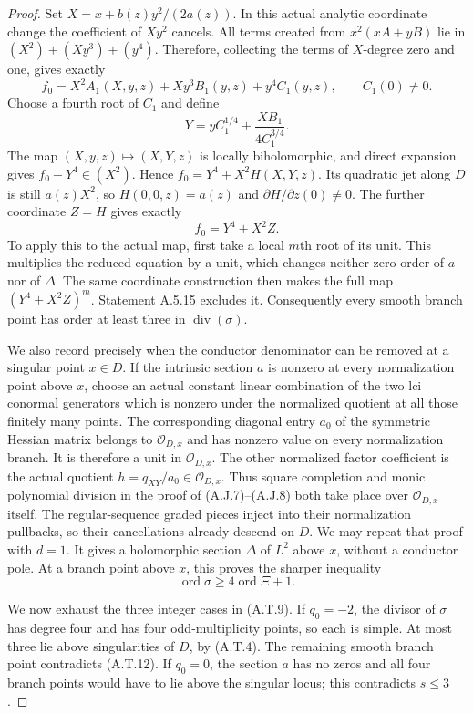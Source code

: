 \begin{proof}
Set $X=x+b(z)y^2/(2a(z))$. In this actual analytic
coordinate change the coefficient of $Xy^2$ cancels.
All terms created from $x^2(xA+yB)$ lie in
$(X^2)+(Xy^3)+(y^4)$. Therefore, collecting the
terms of $X$-degree zero and one, gives exactly
\[
 f_0=X^2A_1(X,y,z)+Xy^3B_1(y,z)+y^4C_1(y,z),
 \qquad C_1(0)\ne0.
\]
Choose a fourth root of $C_1$ and define
\[
 Y=yC_1^{1/4}+
                  \frac{XB_1}{4C_1^{3/4}}.
                                                        \tag{A.T.11}
\]
The map $(X,y,z)\mapsto(X,Y,z)$ is locally
biholomorphic, and direct expansion gives
$f_0-Y^4\in(X^2)$. Hence $f_0=Y^4+X^2H(X,Y,z)$.
Its quadratic jet along $D$ is still $a(z)X^2$,
so $H(0,0,z)=a(z)$ and $\partial H/\partial z(0)\ne0$.
The further coordinate $Z=H$ gives exactly
\[
                         f_0=Y^4+X^2Z.             \tag{A.T.12}
\]
To apply this to the actual map, first take a local
$m$th root of its unit. This multiplies the reduced
equation by a unit, which changes neither zero order
of $a$ nor of $\Delta$. The same coordinate construction
then makes the full map $(Y^4+X^2Z)^m$.
Statement A.5.15 excludes it. Consequently every
smooth branch point has order at least three in
$\operatorname{div}(\sigma)$.

We also record precisely when the conductor denominator
can be removed at a singular point $x\in D$.
If the intrinsic section $a$ is nonzero at every
normalization point above $x$, choose an actual
constant linear combination of the two lci conormal
generators which is nonzero under the normalized
quotient at all those finitely many points. The
corresponding diagonal entry $a_0$ of the symmetric
Hessian matrix belongs to $\mathcal O_{D,x}$ and
has nonzero value on every normalization branch.
It is therefore a unit in $\mathcal O_{D,x}$.
The other normalized factor coefficient is the
actual quotient $h=q_{XY}/a_0\in\mathcal O_{D,x}$.
Thus square completion and monic polynomial division
in the proof of (A.J.7)--(A.J.8) both take place
over $\mathcal O_{D,x}$ itself. The regular-sequence
graded pieces inject into their normalization
pullbacks, so their cancellations already descend
on $D$. We may repeat that proof with $d=1$.
It gives a holomorphic section $\Delta$ of $L^2$
above $x$, without a conductor pole. At a branch
point above $x$, this proves the sharper inequality
\[
 \operatorname{ord}\sigma\ge
                        4\operatorname{ord}\Xi+1.
                                                        \tag{A.T.13}
\]

We now exhaust the three integer cases in (A.T.9).
If $q_0=-2$, the divisor of $\sigma$ has degree four
and has four odd-multiplicity points, so each is
simple. At most three lie above singularities of
$D$, by (A.T.4). The remaining smooth branch point
contradicts (A.T.12).
If $q_0=0$, the section $a$ has no zeros and all
four branch points would have to lie above the
singular locus; this contradicts $s\le3$.


\end{proof}

